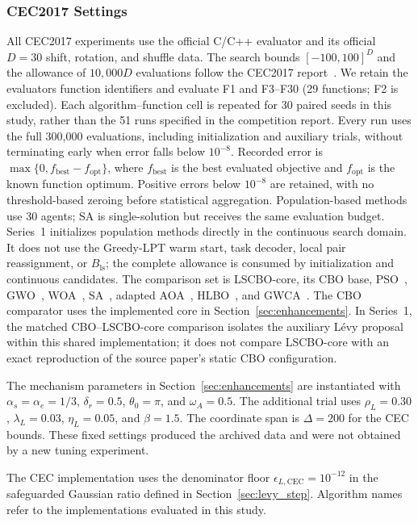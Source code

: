 \documentclass[pdflatex,onecolumn,sn-mathphys-num]{sn-jnl}
\begin{document}
\subsubsection{CEC2017 Settings}\label{sec:cec_settings}
All CEC2017 experiments use the official C/C++ evaluator and its official $D=30$ shift, rotation, and shuffle data. The search bounds $[-100,100]^D$ and the allowance of $10{,}000D$ evaluations follow the CEC2017 report~\cite{Awad2016}. We retain the evaluator\textquotesingle s function identifiers and evaluate F1 and F3--F30 (29 functions; F2 is excluded). Each algorithm--function cell is repeated for 30 paired seeds in this study, rather than the 51 runs specified in the competition report. Every run uses the full 300,000 evaluations, including initialization and auxiliary trials, without terminating early when error falls below $10^{-8}$. Recorded error is $\max\{0,f_{\mathrm{best}}-f_{\mathrm{opt}}\}$, where $f_{\mathrm{best}}$ is the best evaluated objective and $f_{\mathrm{opt}}$ is the known function optimum. Positive errors below $10^{-8}$ are retained, with no threshold-based zeroing before statistical aggregation. Population-based methods use 30 agents; SA is single-solution but receives the same evaluation budget. Series~1 initializes population methods directly in the continuous search domain. It does not use the Greedy-LPT warm start, task decoder, local pair reassignment, or $B_{\mathrm{ls}}$; the complete allowance is consumed by initialization and continuous candidates. The comparison set is LSCBO-core, its CBO base, PSO~\cite{Kennedy1995}, GWO~\cite{Mirjalili2014}, WOA~\cite{Mirjalili2016}, SA~\cite{Kirkpatrick1983}, adapted AOA~\cite{Abualigah2021}, HLBO~\cite{Dehghani2022HLBO}, and GWCA~\cite{Guan2023GWCA}. The CBO comparator uses the implemented core in Section~\ref{sec:enhancements}. In Series~1, the matched CBO--LSCBO-core comparison isolates the auxiliary L\'{e}vy proposal within this shared implementation; it does not compare LSCBO-core with an exact reproduction of the source paper's static CBO configuration.

The mechanism parameters in Section~\ref{sec:enhancements} are instantiated with $\alpha_s=\alpha_e=1/3$, $\delta_r=0.5$, $\theta_0=\pi$, and $\omega_A=0.5$. The additional trial uses $\rho_L=0.30$, $\lambda_L=0.03$, $\eta_L=0.05$, and $\beta=1.5$. The coordinate span is $\Delta=200$ for the CEC bounds. These fixed settings produced the archived data and were not obtained by a new tuning experiment.

The CEC implementation uses the denominator floor $\epsilon_{L,\mathrm{CEC}}=10^{-12}$ in the safeguarded Gaussian ratio defined in Section~\ref{sec:levy_step}. Algorithm names refer to the implementations evaluated in this study.
\end{document}
